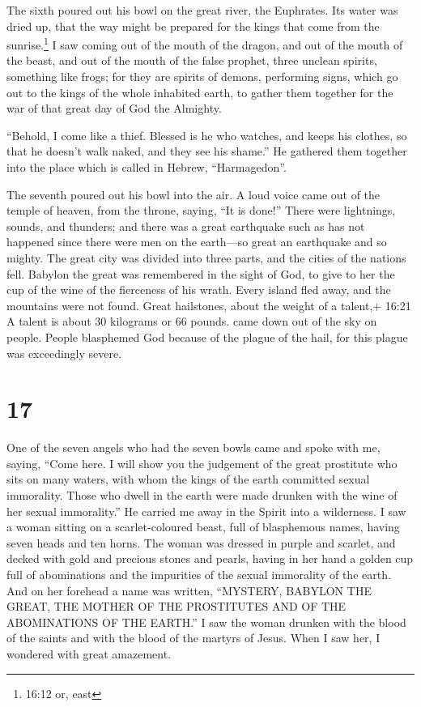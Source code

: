 The sixth poured out his bowl on the great river, the
Euphrates. Its water was dried up, that the way might be prepared for
the kings that come from the sunrise.\footnote{16:12 or, east}
 I saw coming out of the mouth of the dragon, and out of
the mouth of the beast, and out of the mouth of the false prophet, three
unclean spirits, something like frogs;  for they are
spirits of demons, performing signs, which go out to the kings of the
whole inhabited earth, to gather them together for the war of that great
day of God the Almighty.

 ``Behold, I come like a thief. Blessed is he who watches,
and keeps his clothes, so that he doesn't walk naked, and they see his
shame.''  He gathered them together into the place which is
called in Hebrew, ``Harmagedon''.

 The seventh poured out his bowl into the air. A loud voice
came out of the temple of heaven, from the throne, saying, ``It is
done!''  There were lightnings, sounds, and thunders; and
there was a great earthquake such as has not happened since there were
men on the earth---so great an earthquake and so mighty. 
The great city was divided into three parts, and the cities of the
nations fell. Babylon the great was remembered in the sight of God, to
give to her the cup of the wine of the fierceness of his wrath.
 Every island fled away, and the mountains were not found.
 Great hailstones, about the weight of a talent,+ 16:21 A
talent is about 30 kilograms or 66 pounds. came down out of the sky on
people. People blasphemed God because of the plague of the hail, for
this plague was exceedingly severe.

\hypertarget{section-16}{%
\section{17}\label{section-16}}

 One of the seven angels who had the seven bowls came and
spoke with me, saying, ``Come here. I will show you the judgement of the
great prostitute who sits on many waters,  with whom the
kings of the earth committed sexual immorality. Those who dwell in the
earth were made drunken with the wine of her sexual immorality.''
 He carried me away in the Spirit into a wilderness. I saw a
woman sitting on a scarlet-coloured beast, full of blasphemous names,
having seven heads and ten horns.  The woman was dressed in
purple and scarlet, and decked with gold and precious stones and pearls,
having in her hand a golden cup full of abominations and the impurities
of the sexual immorality of the earth.  And on her forehead
a name was written, ``MYSTERY, BABYLON THE GREAT, THE MOTHER OF THE
PROSTITUTES AND OF THE ABOMINATIONS OF THE EARTH.''  I saw
the woman drunken with the blood of the saints and with the blood of the
martyrs of Jesus. When I saw her, I wondered with great amazement.

